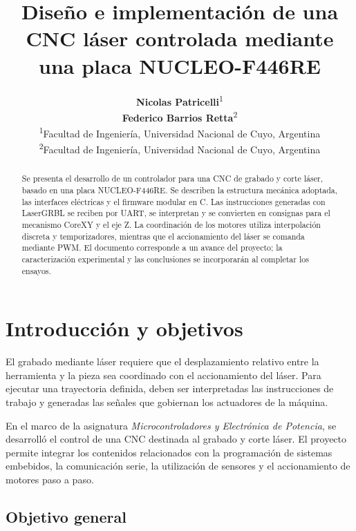 \documentclass[blue,fullpaper]{ludusofficial}  %
\title{Diseño e implementación de una CNC láser controlada mediante una placa NUCLEO-F446RE}
\author{%
    \textbf{Nicolas Patricelli}\textsuperscript{1}\\
    [0.2cm]
    \textbf{Federico Barrios Retta}\textsuperscript{2}\\
    [0.2cm]
    \mdseries\small\textsuperscript{1}Facultad de Ingeniería, Universidad Nacional de Cuyo, Argentina\\
    \mdseries\small\textsuperscript{2}Facultad de Ingeniería, Universidad Nacional de Cuyo, Argentina
}
\begin{document}
\begin{abstract}

Se presenta el desarrollo de un controlador para una CNC de grabado y corte láser, basado en una placa NUCLEO-F446RE. Se describen la estructura mecánica adoptada, las interfaces eléctricas y el firmware modular en C. Las instrucciones generadas con LaserGRBL se reciben por UART, se interpretan y se convierten en consignas para el mecanismo CoreXY y el eje Z. La coordinación de los motores utiliza interpolación discreta y temporizadores, mientras que el accionamiento del láser se comanda mediante PWM. El documento corresponde a un avance del proyecto; la caracterización experimental y las conclusiones se incorporarán al completar los ensayos.

\end{abstract}


\maketitle
\normalsize

\onecolumn
\raggedbottom
{\small\tableofcontents}
\clearpage

\newpage

\section{Introducción y objetivos}
\label{sec:introduccion}

El grabado mediante láser requiere que el desplazamiento
relativo entre la herramienta y la pieza sea coordinado
con el accionamiento del láser. Para ejecutar una trayectoria
definida, deben ser interpretadas las instrucciones de
trabajo y generadas las señales que gobiernan los actuadores
de la máquina.

En el marco de la asignatura \textit{Microcontroladores y Electrónica de Potencia}, se desarrolló el control de una CNC destinada al grabado y corte láser. El proyecto permite integrar
los contenidos relacionados con la programación de
sistemas embebidos, la comunicación serie, la utilización
de sensores y el accionamiento de motores paso a paso.

\subsection{Objetivo general}
\end{document}

